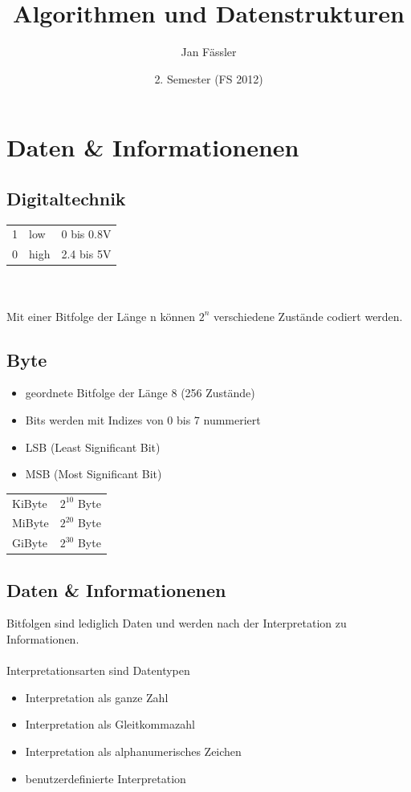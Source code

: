 \documentclass[a4paper,10pt]{article}
\title{Algorithmen und Datenstrukturen}
\author{Jan F\"assler}
\date{2. Semester (FS 2012)}
\begin{document}
\maketitle
\newpage
\thispagestyle{fancy} %

\section{Daten \& Informationenen}

\subsection{Digitaltechnik}
\begin{tabular}{l l l}
	1 & low & 0 bis 0.8V \\
	0 & high & 2.4 bis 5V
\end{tabular} \\ \\
Mit einer Bitfolge der L\"ange n k\"onnen $2^n$ verschiedene Zust\"ande codiert werden.

\subsection{Byte}
\begin{itemize}
	\item geordnete Bitfolge der L\"ange 8 (256 Zust\"ande)
	\item Bits werden mit Indizes von 0 bis 7 nummeriert
	\item LSB (Least Significant Bit)
	\item MSB (Most Significant Bit)
\end{itemize}
\begin{tabular}{l l}
	KiByte & $2^{10}$ Byte \\
	MiByte & $2^{20}$ Byte \\
	GiByte & $2^{30}$ Byte \\
\end{tabular}

\subsection{Daten \& Informationenen}
Bitfolgen sind lediglich Daten und werden nach der Interpretation zu Informationen. \\ \\
Interpretationsarten sind Datentypen
\begin{itemize}
	\item Interpretation als ganze Zahl
	\item Interpretation als Gleitkommazahl
	\item Interpretation als alphanumerisches Zeichen
	\item benutzerdefinierte Interpretation
\end{itemize}
\end{document}
